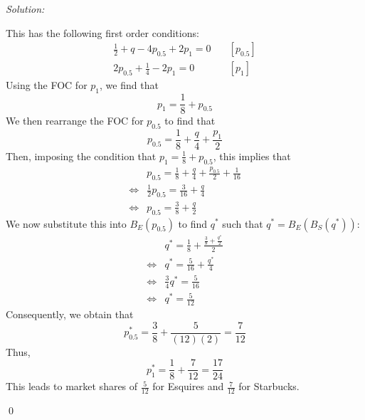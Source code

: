 \documentclass[12pt]{article}
\newenvironment{sol}
    {\emph{Solution:}
    }
    {
    \qed
    }
\begin{document}
\begin{sol}
\begin{enumerate}[label=\alph*) ]
        This has the following first order conditions:
        \begin{align*}
            \frac{1}{2} + q - 4 p_{0.5} + 2 p_1 = 0 &\quad [p_{0.5}]\\
            2p_{0.5} + \frac{1}{4} - 2 p_1 = 0 &\quad [p_1]
        \end{align*}
        Using the FOC for $p_1$, we find that 
        \[p_1 = \frac{1}{8} + p_{0.5}\]
        We then rearrange the FOC for $p_{0.5}$ to find that
        \[p_{0.5} = \frac{1}{8} + \frac{q}{4} + \frac{p_1}{2}\]
        Then, imposing the condition that $p_1 = \frac{1}{8} + p_{0.5}$, this implies that 
        \begin{align*}&p_{0.5} = \frac{1}{8} + \frac{q}{4} + \frac{p_{0.5}}{2} + \frac{1}{16} \\
            \iff&\frac{1}{2} p_{0.5} = \frac{3}{16} + \frac{q}{4}\\
            \iff& p_{0.5} = \frac{3}{8} + \frac{q}{2}
         \end{align*}
         We now substitute this into $B_E(p_{0.5})$ to find $q^*$ such that $q^* = B_E(B_S(q^*))$:
         \begin{align*}
            &q^* = \frac{1}{8} + \frac{\frac{3}{8} + \frac{q^*}{2}}{2}\\
            \iff& q^* = \frac{5}{16} + \frac{q^*}{4}\\
            \iff& \frac{3}{4} q^* = \frac{5}{16}\\
            \iff& q^* = \frac{5}{12}
         \end{align*}
         Consequently, we obtain that
         \[p_{0.5}^* = \frac{3}{8} + \frac{5}{(12)(2)} = \frac{7}{12}\]
         Thus,
         \[p_{1}^* = \frac{1}{8} + \frac{7}{12} = \frac{17}{24}\]
         This leads to market shares of $\frac{5}{12}$ for Esquires and $\frac{7}{12}$ for Starbucks. 


\end{enumerate}
\end{sol}
\end{document}
